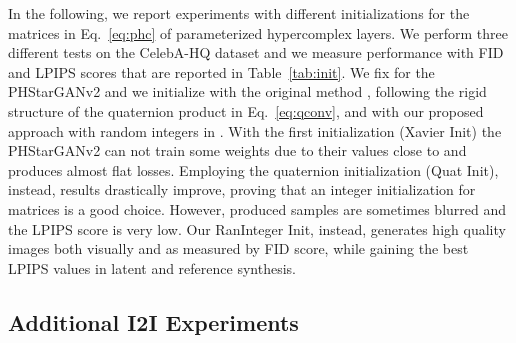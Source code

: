 \documentclass[conference]{IEEEtran}
\begin{document}
In the following, we report experiments with different initializations for the matrices  in Eq.~\ref{eq:phc} of parameterized hypercomplex layers. We perform three different tests on the CelebA-HQ dataset and we measure performance with FID and LPIPS scores that are reported in Table~\ref{tab:init}. We fix  for the PHStarGANv2 and we initialize  with the original method \cite{grassucci2021lightweight}, following the rigid structure of the quaternion product in Eq.~\ref{eq:qconv}, and with our proposed approach with random integers in . With the first initialization (Xavier Init) the PHStarGANv2 can not train some weights due to their values close to  and produces almost flat losses. Employing the quaternion initialization (Quat Init), instead, results drastically improve, proving that an integer initialization for matrices  is a good choice. However, produced samples are sometimes blurred and the LPIPS score is very low. Our RanInteger Init, instead, generates high quality images both visually and as measured by FID score, while gaining the best LPIPS values in latent and reference synthesis.
\begin{table}[]
\centering
\caption{Initializations of  in PH layers in PHStarGANv2 .}
\label{tab:init}
\end{table}

\subsection{Additional I2I Experiments}
\end{document}
